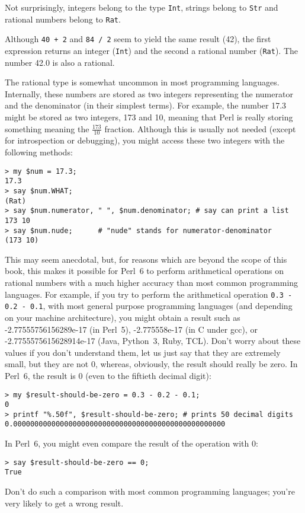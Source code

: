 Not surprisingly, integers belong to the type {\tt Int},
strings belong to {\tt Str} and rational 
numbers belong to {\tt Rat}.  

Although {\tt 40 + 2} and {\tt 84 / 2} seem to yield the 
same result (42), the first expression returns an integer 
({\tt Int}) and the second a rational number ({\tt Rat}). 
The number 42.0 is also a rational.

The rational type is somewhat uncommon in most programming 
languages. Internally, these numbers are stored as two 
integers representing the numerator and the denominator 
(in their simplest terms). For example, the number 17.3 
might be stored as two integers, 173 and 10, meaning that 
Perl is really storing something meaning the $\frac{173}{10}$ 
fraction. Although this is usually not needed (except 
for introspection or debugging), you might access these 
two integers with the following methods:

\begin{verbatim}
> my $num = 17.3;
17.3
> say $num.WHAT;
(Rat)
> say $num.numerator, " ", $num.denominator; # say can print a list
173 10
> say $num.nude;      # "nude" stands for numerator-denominator
(173 10) 
\end{verbatim}
%
This may seem anecdotal, but, for reasons which are 
beyond the scope of this book, this makes it possible for Perl~6 
to perform arithmetical operations on rational numbers with 
a much higher accuracy than most common programming languages. 
For example, if you try to perform the arithmetical operation
\verb'0.3 - 0.2 - 0.1', with most general purpose programming languages 
(and depending on your machine architecture), you 
might obtain a result such as -2.77555756156289e-17 (in Perl~5), 
-2.775558e-17 (in C under gcc), or -2.7755575615628914e-17 
(Java, Python~3, Ruby, TCL). Don't worry about these values if you 
don't understand them, let us just say that they  are 
extremely small, but they are not 0, whereas,  
obviously, the result should really be zero. In Perl~6, 
the result is 0 (even to the fiftieth decimal digit):
\begin{verbatim}
> my $result-should-be-zero = 0.3 - 0.2 - 0.1;
0
> printf "%.50f", $result-should-be-zero; # prints 50 decimal digits
0.00000000000000000000000000000000000000000000000000
\end{verbatim}
%
In Perl~6, you might even compare the result of the operation with 0:
\begin{verbatim}
> say $result-should-be-zero == 0;
True
\end{verbatim}
%
Don't do such a comparison with most common programming 
languages; you're very likely to get a wrong result.

